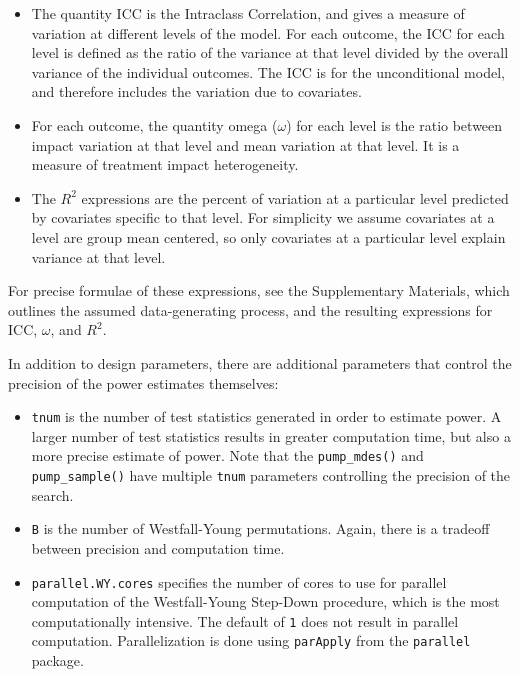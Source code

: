 \documentclass[
]{article}
\providecommand{\tightlist}{%
  \setlength{\itemsep}{0pt}\setlength{\parskip}{0pt}}
\begin{document}
\begin{itemize}
\item
  The quantity \(\text{ICC}\) is the Intraclass Correlation, and gives a
  measure of variation at different levels of the model. For each
  outcome, the ICC for each level is defined as the ratio of the
  variance at that level divided by the overall variance of the
  individual outcomes. The ICC is for the unconditional model, and
  therefore includes the variation due to covariates.
\item
  For each outcome, the quantity omega (\(\omega\)) for each level is
  the ratio between impact variation at that level and mean variation at
  that level. It is a measure of treatment impact heterogeneity.
\item
  The \(R^2\) expressions are the percent of variation at a particular
  level predicted by covariates specific to that level. For simplicity
  we assume covariates at a level are group mean centered, so only
  covariates at a particular level explain variance at that level.
\end{itemize}

For precise formulae of these expressions, see the Supplementary
Materials, which outlines the assumed data-generating process, and the
resulting expressions for \(\text{ICC}\), \(\omega\), and \(R^2\).

In addition to design parameters, there are additional parameters that
control the precision of the power estimates themselves:

\begin{itemize}
\tightlist
\item
  \texttt{tnum} is the number of test statistics generated in order to
  estimate power. A larger number of test statistics results in greater
  computation time, but also a more precise estimate of power. Note that
  the \texttt{pump\_mdes()} and \texttt{pump\_sample()} have multiple
  \texttt{tnum} parameters controlling the precision of the search.
\item
  \texttt{B} is the number of Westfall-Young permutations. Again, there
  is a tradeoff between precision and computation time.
\item
  \texttt{parallel.WY.cores} specifies the number of cores to use for
  parallel computation of the Westfall-Young Step-Down procedure, which
  is the most computationally intensive. The default of \texttt{1} does
  not result in parallel computation. Parallelization is done using
  \texttt{parApply} from the \texttt{parallel} package.
\end{itemize}
\end{document}
